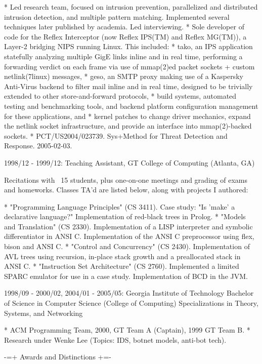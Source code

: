 * Led research team, focused on intrusion prevention, parallelized and
  distributed intrusion detection, and multiple pattern matching. Implemented
  several techniques later published by academia. Led interviewing.
* Sole developer of code for the Reflex Interceptor (now Reflex IPS(TM) and
  Reflex MG(TM)), a Layer-2 bridging NIPS running Linux. This included:
    * tako, an IPS application statefully analyzing multiple GigE links inline
      and in real time, performing a forwarding verdict on each frame via use
      of mmap(2)ed packet sockets + custom netlink(7linux) messages,
    * geso, an SMTP proxy making use of a Kaspersky Anti-Virus backend to
      filter mail inline and in real time, designed to be trivially extended
      to other store-and-forward protocols,
    * build systems, automated testing and benchmarking tools, and backend
      platform configuration management for these applications, and
    * kernel patches to change driver mechanics, expand the netlink socket
      infrastructure, and provide an interface into mmap(2)-backed sockets.
* PCT/US2004/023739. Sys+Method for Threat Detection and Response. 2005-02-03.

1998/12 - 1999/12: Teaching Assistant, GT College of Computing (Atlanta, GA)

Recitations with ~15 students, plus one-on-one meetings and grading of exams
and homeworks. Classes TA'd are listed below, along with projects I authored:

* "Programming Language Principles" (CS 3411). Case study: "Is 'make' a
   declarative language?" Implementation of red-black trees in Prolog.
* "Models and Translation" (CS 2330). Implementation of a LISP interpreter
   and symbolic differentiator in ANSI C. Implementation of the ANSI C
   preprocessor using flex, bison and ANSI C.
* "Control and Concurrency" (CS 2430). Implementation of AVL trees using
   recursion, in-place stack growth and a preallocated stack in ANSI C.
* "Instruction Set Architecture" (CS 2760). Implemented a limited SPARC
   emulator for use in a case study. Implementation of BCD in the JVM.

1998/09 - 2000/02, 2004/01 - 2005/05: Georgia Institute of Technology
Bachelor of Science in Computer Science (College of Computing)
Specializations in Theory, Systems, and Networking

* ACM Programming Team, 2000, GT Team A (Captain), 1999 GT Team B.
* Research under Wenke Lee (Topics: IDS, botnet models, anti-bot tech).

  -=+ Awards and Distinctions +=-

